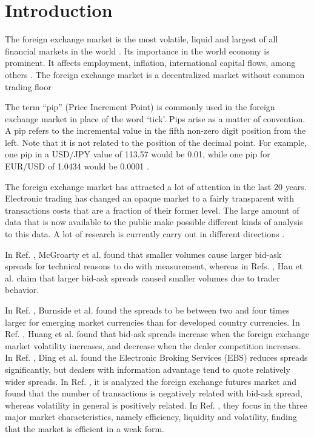 \section{Introduction}\label{sec:introduction}

The foreign exchange market is the most volatile, liquid and largest of all
financial markets in the world
\cite{forex_liquidity,info_forex,intraday_forex}. Its importance in the world
economy is prominent. It affects employment, inflation, international capital
flows, among others \cite{forex_structure}. The foreign exchange market is a
decentralized market without common trading floor
\cite{forex_structure,info_forex,teach_spread}

The term ``pip'' (Price Increment Point) is commonly used in the foreign
exchange market in place of the word ‘tick’. Pips arise as a matter of
convention. A pip refers to the incremental value in the fifth non-zero digit
position from the left. Note that it is not related to the position of the
decimal point. For example, one pip in a USD/JPY value of 113.57 would be 0.01,
while one pip for EUR/USD of 1.0434 would be 0.0001
\cite{micro_eff,forex_structure}.

The foreign exchange market has attracted a lot of attention in the last 20
years. Electronic trading has changed an opaque market to a fairly transparent
with transactions costs that are a fraction of their former level. The large
amount of data that is now available to the public make possible different
kinds of analysis to this data. A lot of research is currently carry out in
different directions
\cite{curr_speculation,forex_algorithmic,forex_inefficiency,forex_structure,electronic_forex,eur_change_forex,info_forex,intraday_forex,patterns_forex,teach_spread,spread_competition,political_forex,forex_microstructure,forex_volatility,forex_liquidity}.

In Ref. \cite{micro_eff}, McGroarty et al. found that smaller volumes cause
larger bid-ask spreads for technical reasons to do with measurement, whereas in
Refs. \cite{eur_int_curr,eur_change_forex}, Hau et al. claim that larger
bid-ask spreads caused smaller volumes due to trader behavior.

In Ref. \cite{curr_speculation}, Burnside et al. found the spreads to be
between two and four times larger for emerging market currencies than for
developed country currencies. In Ref. \cite{spread_competition}, Huang et al.
found that bid-ask spreads increase when the foreign exchange market volatility
increases, and decrease when the dealer competition increases. In Ref.
\cite{electronic_forex}, Ding et al. found the Electronic Broking Services
(EBS) reduces spreads significantly, but dealers with information advantage
tend to quote relatively wider spreads. In Ref. \cite{spread_futures}, it is
analyzed the foreign exchange futures market and found that the number of
transactions is negatively related with bid-ask spread, whereas volatility in
general is positively related. In Ref. \cite{intraday_forex}, they focus in the
three major market characteristics, namely efficiency, liquidity and
volatility, finding that the market is efficient in a weak form.

